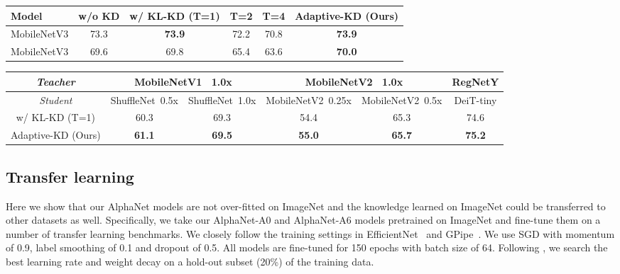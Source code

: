\documentclass{article}
\begin{document}
\begin{table*}[ht]
    \centering
    \begin{tabular}{l|c|ccc|c}
    \hline 
      Model  & w/o KD &  w/ KL-KD (T=1) & T=2  &T=4  & Adaptive-KD (Ours) \\ \hline
      MobileNetV3  & 73.3 &\bf 73.9 & 72.2 & 70.8 &\bf 73.9  \\ 
      MobileNetV3  & 69.6 & 69.8 & 65.4 & 63.6 & \bf 70.0 \\ \hline
    \end{tabular}
    \caption{
    Comparison to KL based KD with fixed teacher models on ImageNet.
Here  denotes the temperature used in classic KL based KD (see Appendix~\ref{app:kd}). 
    We use a MobileNetV3  as our teacher model, which yields  top-1 validation accuracy on ImageNet. All MobileNetV3 student models are trained for 360 epochs with cosine learning rate decay.}
    \label{tab:mbv3}
\vspace{1.5em}
    \begin{tabular}{c|cc|cc|c}
    \hline 
   \emph{Teacher}  & \multicolumn{2}{c|}{MobileNetV1 {~\small 1.0x}} & \multicolumn{2}{c|}{ MobileNetV2 {~\small 1.0x}}  & RegNetY \\
      \hline 
     \emph{Student}  &  ShuffleNet{~\small 0.5x} &  ShuffleNet{~\small 1.0x} & MobileNetV2{~\small 0.25x}  & MobileNetV2{~\small 0.5x} &  DeiT-tiny  \\
      \hline
      w/ KL-KD (T=1) & 60.3 & 69.3 &  54.4  & 65.3 & 74.6  \\
      Adaptive-KD (Ours) & \bf 61.1  & \bf 69.5  & \bf 55.0   & \bf  65.7   & \bf 75.2 \\
      \hline
    \end{tabular}
    \caption{Additional KD results on ImageNet. Our MobileNet V1 and V2 teacher has a top-1 accuracy of 73.2\% and 72.9\%, respectively. 
    All ShuffleNets~\citep{ma2018shufflenet} and MobileNetV2 models are trained for 120 epochs with standard random crop and resize data augmentation.
    For DeiT-tiny~\citep{touvron2020training}, we exactly follow the settings of DeiT for training and use a RegNetY~\citep{radosavovic2020designing} as the teacher model.}
    \label{tab:kd_standard}
\end{table*}



\subsection{Transfer learning}
\label{sec:exp_transfer}
Here we show that our AlphaNet models are not over-fitted on ImageNet and the knowledge learned on ImageNet could be transferred to other datasets as well. Specifically, we take our AlphaNet-A0 and AlphaNet-A6 models pretrained on ImageNet and fine-tune them on a number of transfer learning benchmarks.
We closely follow the training settings in EfficientNet~\citep{tan2019efficientnet} and GPipe~\citep{huang2018gpipe}. 
We use SGD with momentum of 0.9, label smoothing of 0.1 and dropout of 0.5. 
All models are fine-tuned for 150 epochs with batch size of 64. 
Following \citet{huang2018gpipe}, we search the best learning rate and weight decay on a hold-out subset (20\%) of the training data. 
\end{document}
